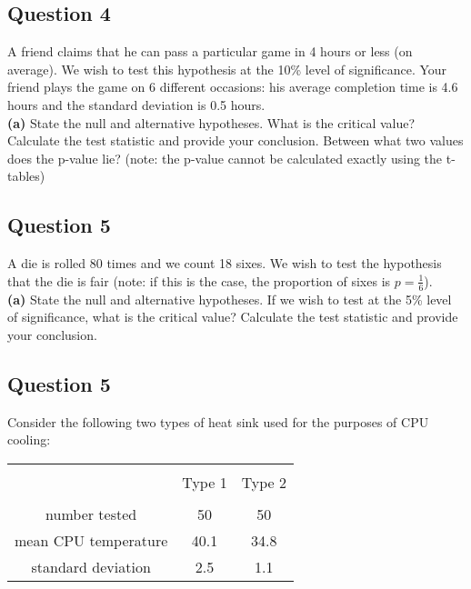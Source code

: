\subsection*{Question 4}
A friend claims that he can pass a particular game in 4 hours or less (on average). We wish to test this hypothesis at the 10\% level of significance. Your friend plays the game on 6 different occasions: his average completion time is 4.6 hours and the standard deviation is 0.5 hours. \\[-0.2cm]

{\bf(a)} State the null and alternative hypotheses.  What is the critical value?  Calculate the test statistic and provide your conclusion.  Between what two values does the p-value lie? (note: the p-value cannot be calculated exactly using the t-tables)



\subsection*{Question 5}
A die is rolled 80 times and we count 18 sixes. We wish to test the hypothesis that the die is fair (note: if this is the case, the proportion of sixes is $p = \frac{1}{6}$). \\[-0.2cm]

{\bf(a)} State the null and alternative hypotheses.  If we wish to test at the 5\% level of significance, what is the critical value?  Calculate the test statistic and provide your conclusion.



\newpage\subsection*{Question 5}
Consider the following two types of heat sink used for the purposes of CPU cooling:\\[-0.4cm]
\begin{center}
\begin{tabular}{|c|c|c|}
\hline
&&\\[-0.3cm]
& Type 1 & Type 2 \\
\hline
&&\\[-0.3cm]
number tested      & 50 & 50 \\
mean CPU temperature   & 40.1  & 34.8 \\
standard deviation &  2.5 & 1.1 \\[0.1cm]
\hline
\end{tabular}
\end{center}

